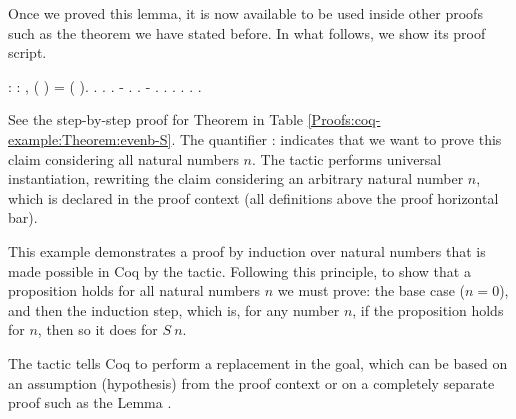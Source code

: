 Once we proved this lemma, it is now available to be used inside other proofs such as the theorem we have stated before. In what follows, we show its proof script.

\begin{coqdoccode}
	\coqdocnoindent
	  : \coqdockw{\ensuremath{\forall}}  : ,\coqdoceol
	\coqdocindent{1.00em}
	 ( ) =  ( ).\coqdoceol
	\coqdocnoindent
	.\coqdoceol
	\coqdocindent{1.00em}
	.  .\coqdoceol
	\coqdocindent{1.00em}
	- . .\coqdoceol
	\coqdocindent{1.00em}
	- .   .  .\coqdoceol
	\coqdocindent{2.00em}
	 . .\coqdoceol
	\coqdocnoindent
	.\coqdoceol
\end{coqdoccode}

See the step-by-step proof for Theorem  in Table \ref{Proofs:coq-example:Theorem:evenb-S}. The quantifier \coqdockw{\ensuremath{\forall}} : indicates that we want to prove this claim considering all natural numbers $ n $. The tactic  performs universal instantiation, rewriting the claim considering an arbitrary natural number $ n $, which is declared in the proof context (all definitions above the proof horizontal bar).

This example demonstrates a proof by induction over natural numbers that is made possible in Coq by the  tactic. Following this principle, to show that a proposition holds for all natural numbers $ n $ we must prove: the base case ($ n = 0 $), and then the induction step, which is, for any number $ n $, if the proposition holds for $ n $, then so it does for $ S \ n $.

The tactic  tells Coq to perform a replacement in the goal, which can be based on an assumption (hypothesis) from the proof context or on a completely separate proof such as the Lemma .


